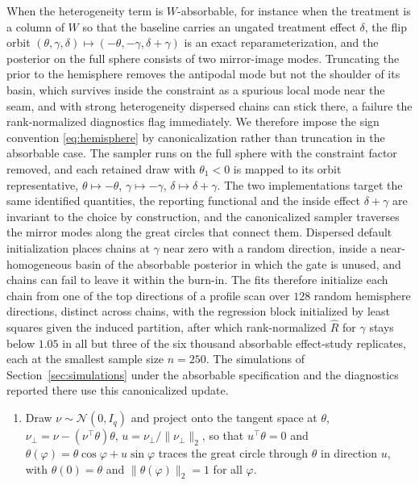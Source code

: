 \documentclass[11pt]{article}
\theoremstyle{definition}
\theoremstyle{plain}
\begin{document}
\begin{enumerate}[leftmargin=*,nosep]
When the heterogeneity term is $W$-absorbable, for instance when the treatment is a column of $W$ so that the baseline carries an ungated treatment effect $\delta$, the flip orbit $(\theta,\gamma,\delta)\mapsto(-\theta,-\gamma,\delta+\gamma)$ is an exact reparameterization, and the posterior on the full sphere consists of two mirror-image modes. Truncating the prior to the hemisphere removes the antipodal mode but not the shoulder of its basin, which survives inside the constraint as a spurious local mode near the seam, and with strong heterogeneity dispersed chains can stick there, a failure the rank-normalized diagnostics flag immediately. We therefore impose the sign convention \eqref{eq:hemisphere} by canonicalization rather than truncation in the absorbable case. The sampler runs on the full sphere with the constraint factor removed, and each retained draw with $\theta_1<0$ is mapped to its orbit representative, $\theta\mapsto-\theta$, $\gamma\mapsto-\gamma$, $\delta\mapsto\delta+\gamma$. The two implementations target the same identified quantities, the reporting functional and the inside effect $\delta+\gamma$ are invariant to the choice by construction, and the canonicalized sampler traverses the mirror modes along the great circles that connect them. Dispersed default initialization places chains at $\gamma$ near zero with a random direction, inside a near-homogeneous basin of the absorbable posterior in which the gate is unused, and chains can fail to leave it within the burn-in. The fits therefore initialize each chain from one of the top directions of a profile scan over $128$ random hemisphere directions, distinct across chains, with the regression block initialized by least squares given the induced partition, after which rank-normalized $\widehat R$ for $\gamma$ stays below $1.05$ in all but three of the six thousand absorbable effect-study replicates, each at the smallest sample size $n=250$. The simulations of Section~\ref{sec:simulations} under the absorbable specification and the diagnostics reported there use this canonicalized update.
\begin{enumerate}[label=\textup{(\arabic*)},nosep,leftmargin=2.2em]
\item Draw $\nu\sim\mathcal N(0,I_q)$ and project onto the tangent space at $\theta$, $\nu_\perp=\nu-(\nu^\top\theta)\theta$, $u=\nu_\perp/\|\nu_\perp\|_2$, so that $u^\top\theta=0$ and $\theta(\varphi)=\theta\cos\varphi+u\sin\varphi$ traces the great circle through $\theta$ in direction $u$, with $\theta(0)=\theta$ and $\|\theta(\varphi)\|_2=1$ for all $\varphi$.

\end{enumerate}
\end{enumerate}
\end{document}
